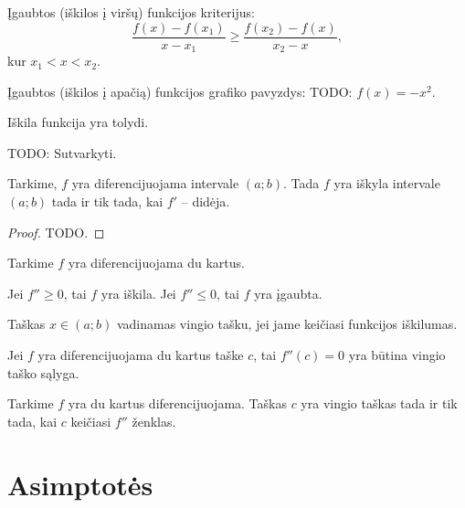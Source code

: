\begin{defn}
  Įgaubtos (iškilos į viršų) funkcijos kriterijus:
  \begin{equation*}
    \frac{f(x) - f(x_{1})}{x - x_{1}}
    \geq \frac{f(x_{2}) - f(x)}{x_{2} - x},
  \end{equation*}
  kur $x_{1} < x < x_{2}$.
\end{defn}

\begin{exmp}
  Įgaubtos (iškilos į apačią) funkcijos grafiko pavyzdys: 
  TODO: $f(x) = -x^{2}$.
\end{exmp}

\begin{prop}
  Iškila funkcija yra tolydi.
\end{prop}

\begin{prop}
  TODO: Sutvarkyti.

  Tarkime, $f$ yra diferencijuojama intervale $(a; b)$. Tada $f$ yra
  iškyla intervale $(a; b)$ tada ir tik tada, kai $f'$ – didėja.

  \begin{proof}
    TODO.
  \end{proof}
\end{prop}

\begin{prop}
  Tarkime $f$ yra diferencijuojama du kartus.

  Jei $f'' \geq 0$, tai $f$ yra iškila.
  Jei $f'' \leq 0$, tai $f$ yra įgaubta.
\end{prop}

\begin{defn}
  Taškas $x \in (a; b)$ vadinamas vingio tašku, jei jame keičiasi funkcijos
  iškilumas.
\end{defn}

\begin{prop}
  Jei $f$ yra diferencijuojama du kartus taške $c$, tai 
  $f''(c) = 0$ yra būtina vingio taško sąlyga.
\end{prop}

\begin{prop}
  Tarkime $f$ yra du kartus diferencijuojama. Taškas $c$ yra vingio
  taškas tada ir tik tada, kai $c$ keičiasi $f''$ ženklas.
\end{prop}

\section{Asimptotės}

